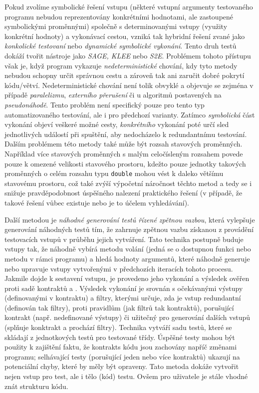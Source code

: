 \documentclass[czech, ma, kiv, he, iso690numb, pdf, viewonly]{fasthesis}
\begin{document}
        Pokud zvolíme symbolické řešení vstupu (některé vstupní argumenty testovaného programu nebudou reprezentovány konkrétními hodnotami, ale zastoupené symbolickými proměnnými) společně s determinovanými vstupy (využity konkrétní hodnoty) a vykonávací cestou, vzniká tak hybridní řešení zvané jako \emph{konkolické testovaní} nebo \emph{dynamické symbolické vykonání}. Tento druh testů dokáží tvořit nástroje jako \textit{SAGE, KLEE} nebo \textit{S2E}. Problémem tohoto přístupu však je, když program vykazuje \emph{nedeterministické} chování, kdy tyto metody nebudou schopny určit správnou cestu a zároveň tak ani zaručit dobré pokrytí kódu/větví. Nedeterministické chování není tolik obvyklé a objevuje se zejména v případě \textit{paralelizmu}, \textit{externího přerušení} či u algoritmů postavených na \textit{pseudonáhodě}. \cite{nlab:nondeterministic_computation} Tento problém není specifický pouze pro tento typ automatizovaného testování, ale i pro předchozí varianty. Zatímco \emph{symbolická} část vykonání objeví veškeré možné cesty, \emph{konkrétního} vykonání poté určí sled jednotlivých událostí při spuštění, aby nedocházelo k redundantnímu testování. \cite{aldrich2019concolic} Dalším problémem této metody také může být rozsah stavových proměnných. Například více stavových proměnných s malým celočísleným rozsahem povede pouze k omezené velikosti stavového prostoru, kdežto pouze jednotky takových proměnných o celém rozsahu typu \verb|double| mohou vést k daleko většímu stavovému prostoru, což také zvýší výpočetní náročnost těchto metod a tedy se i snižuje pravděpodobnost úspěšného nalezení praktického řešení (v případě, že takové řešení vůbec existuje nebo je to účelem vyhledávání). \cite{concolic_chalenges_2019} \cite{engler2006exe} \cite{sen2005cute} \cite{zhou2006safedrive}

        Další metodou je \textit{náhodné generování testů řízené zpětnou vazbou}, která vylepšuje generování náhodných testů tím, že zahrnuje zpětnou vazbu získanou z provádění testovacích vstupů v průběhu jejich vytváření. Tato technika postupně buduje vstupy tak, že náhodně vybírá metodu volání (jedná se o dostupnou funkci nebo metodu v rámci programu) a hledá hodnoty argumentů, které náhodně generuje nebo upravuje vstupy vytvořenými v předchozích iteracích tohoto procesu. Jakmile dojde k sestavení vstupu, je provedeno jeho vykonání a výsledek ověřen proti sadě \gls{kontrakt}ů a . Výsledek vykonání je srovnán s očekávanými výstupy (definovanými v kontraktu) a filtry, kterými určuje, zda je vstup redundantní (definován tak filtry), proti pravidlům (jak filtrů tak kontraktů), porušující \gls{kontrakt} (např. nedefinované výstupy) či užitečný pro generování dalších vstupů (splňuje konktrakt a prochází filtry). Technika vytváří sadu testů, které se skládají z jednotkových testů pro testované třídy. Úspěšné testy mohou být použity k zajištění faktu, že \glspl{kontrakt} kódu jsou zachovány napříč změnami programu; selhávající testy (porušující jeden nebo více kontraktů) ukazují na potenciální chyby, které by měly být opraveny. Tato metoda dokáže vytvořit nejen vstup pro test, ale i tělo (kód) testu. Ovšem pro uživatele je stále vhodné znát strukturu kódu. \cite{FeedbackDirectedRT}
\end{document}
